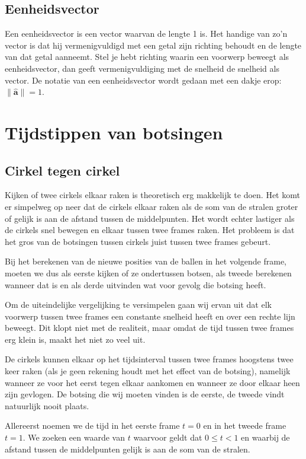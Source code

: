 \documentclass[12pt,a4paper]{article}
\begin{document}
	\subsection{Eenheidsvector}
	Een eenheidsvector is een vector waarvan de lengte 1 is. Het handige van zo'n vector is dat hij vermenigvuldigd met een getal zijn richting behoudt en de lengte van dat getal aanneemt. Stel je hebt richting waarin een voorwerp beweegt als eenheidsvector, dan geeft vermenigvuldiging met de snelheid de snelheid als vector. De notatie van een eenheidsvector wordt gedaan met een dakje erop: $\|\mathbf{\hat{a}}\| = 1$.
	
	\section{Tijdstippen van botsingen}
	
	\subsection{Cirkel tegen cirkel}
	Kijken of twee cirkels elkaar raken is theoretisch erg makkelijk te doen. Het komt er simpelweg op neer dat de cirkels elkaar raken als de som van de stralen groter of gelijk is aan de afstand tussen de middelpunten. Het wordt echter lastiger als de cirkels snel bewegen en elkaar tussen twee frames raken. Het probleem is dat het gros van de botsingen tussen cirkels juist tussen twee frames gebeurt.
	
	Bij het berekenen van de nieuwe posities van de ballen in het volgende frame, moeten we dus als eerste kijken of ze ondertussen botsen, als tweede berekenen wanneer dat is en als derde uitvinden wat voor gevolg die botsing heeft.
	
	Om de uiteindelijke vergelijking te versimpelen gaan wij ervan uit dat elk voorwerp tussen twee frames een constante snelheid heeft en over een rechte lijn beweegt. Dit klopt niet met de realiteit, maar omdat de tijd tussen twee frames erg klein is, maakt het niet zo veel uit.
	
	De cirkels kunnen elkaar op het tijdsinterval tussen twee frames hoogstens twee keer raken (als je geen rekening houdt met het effect van de botsing), namelijk wanneer ze voor het eerst tegen elkaar aankomen en wanneer ze door elkaar heen zijn gevlogen. De botsing die wij moeten vinden is de eerste, de tweede vindt natuurlijk nooit plaats.
	
	Allereerst noemen we de tijd in het eerste frame $t=0$ en in het tweede frame $t=1$. We zoeken een waarde van $t$ waarvoor geldt dat $0 \le t < 1$ en waarbij de afstand tussen de middelpunten gelijk is aan de som van de stralen.
	
\end{document}

